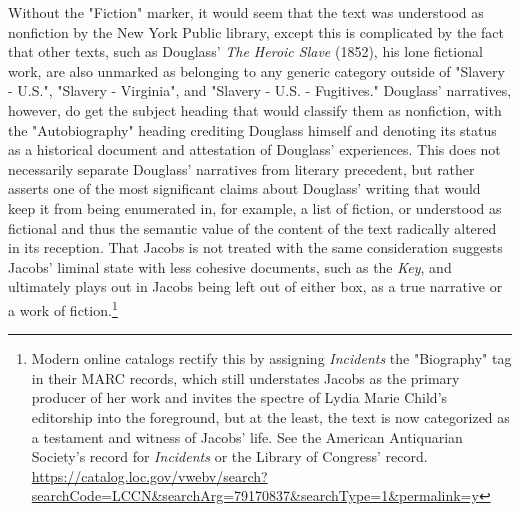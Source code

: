 Without the "Fiction" marker, it would seem that the text was understood as nonfiction by the New York Public library, except this is complicated by the fact that other texts, such as Douglass' \textit{The Heroic Slave} (1852), his lone fictional work, are also unmarked as belonging to any generic category outside of "Slavery - U.S.", "Slavery - Virginia", and "Slavery - U.S. - Fugitives." Douglass' narratives, however, do get the subject heading that would classify them as nonfiction, with the "Autobiography" heading crediting Douglass himself and denoting its status as a historical document and attestation of Douglass' experiences. This does not necessarily separate Douglass' narratives from literary precedent, but rather asserts one of the most significant claims about Douglass' writing that would keep it from being enumerated in, for example, a list of fiction, or understood as fictional and thus the semantic value of the content of the text radically altered in its reception. That Jacobs is not treated with the same consideration suggests Jacobs' liminal state with less cohesive documents, such as the \textit{Key}, and ultimately plays out in Jacobs being left out of either box, as a true narrative or a work of fiction.\footnote{Modern online catalogs rectify this by assigning \textit{Incidents} the "Biography" tag in their MARC records, which still understates Jacobs as the primary producer of her work and invites the spectre of Lydia Marie Child's editorship into the foreground, but at the least, the text is now categorized as a testament and witness of Jacobs' life. See the American Antiquarian Society's record for \textit{Incidents} or the Library of Congress' record. \url{https://catalog.loc.gov/vwebv/search?searchCode=LCCN&searchArg=79170837&searchType=1&permalink=y} }

